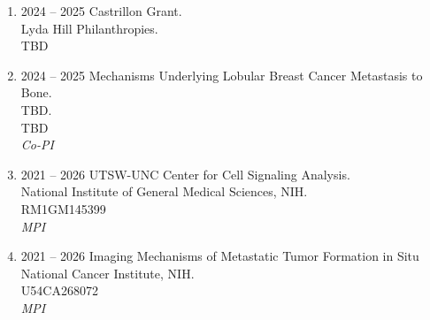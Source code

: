 \begin{enumerate}
[leftmargin=!,
labelindent=0pt,
itemindent=-66pt,
label=\textbullet]

\item 2024 -- 2025 
\hspace{8pt}
Castrillon Grant. \\
Lyda Hill Philanthropies. \\
TBD \\ 

\item 2024 -- 2025 
\hspace{8pt}
Mechanisms Underlying Lobular Breast Cancer Metastasis to Bone. \\
TBD. \\
TBD \\ 
{\it Co-PI}

\item 2021 -- 2026 
\hspace{8pt}
UTSW-UNC Center for Cell Signaling Analysis. \\
National Institute of General Medical Sciences, NIH. \\
RM1GM145399 \\ 
{\it MPI}

\item 2021 -- 2026 
\hspace{8pt}
Imaging Mechanisms of Metastatic Tumor Formation in Situ \\
National Cancer Institute, NIH. \\
U54CA268072 \\ 
{\it MPI}

\end{enumerate}

